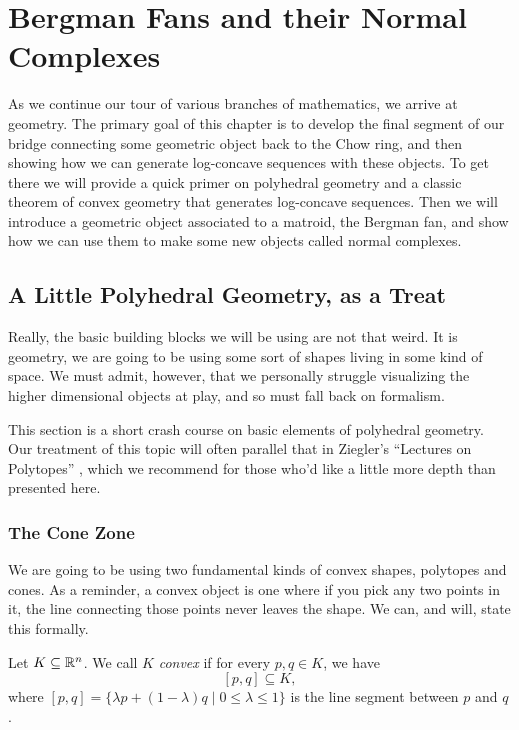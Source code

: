 \documentclass[12pt,oneside]{../../sfsuthesis}
\begin{document}
\chapter{Bergman Fans and their Normal Complexes}
As we continue our tour of various branches of mathematics, we arrive at geometry.
The primary goal of this chapter is to develop the final segment of our bridge connecting some geometric object back to the Chow ring, and then showing how we can generate log-concave sequences with these objects.
To get there we will provide a quick primer on polyhedral geometry and a classic theorem of convex geometry that generates log-concave sequences.
Then we will introduce a geometric object associated to a matroid, the Bergman fan, and show how we can use them to make some new objects called normal complexes.

\section{A Little Polyhedral Geometry, as a Treat}
Really, the basic building blocks we will be using are not that weird.
It is geometry, we are going to be using some sort of shapes living in some kind of space.
We must admit, however, that we personally struggle visualizing the higher dimensional objects at play, and so must fall back on formalism.

This section is a short crash course on basic elements of polyhedral geometry.
Our treatment of this topic will often parallel that in Ziegler's ``Lectures on Polytopes'' \cite{zieglerLecturesPolytopes1995}, which we recommend for those who'd like a little more depth than presented here.

\subsection{The Cone Zone}
We are going to be using two fundamental kinds of convex shapes, polytopes and cones.
As a reminder, a convex object is one where if you pick any two points in it, the line connecting those points never leaves the shape.
We can, and will, state this formally.
\begin{definition}[Convexity]\label{def:convex}
    Let \( K \subseteq \mathbb{R}^n \).
    We call \( K \) \emph{convex} if for every \( p, q \in K \), we have
    \[
        [p, q] \subseteq K,
    \]
    where \( [p, q] = \{ \lambda p + (1 - \lambda) q \; | \; 0 \leq \lambda \leq 1 \} \) is the line segment between \( p \) and \( q \).
\end{definition}
\end{document}
